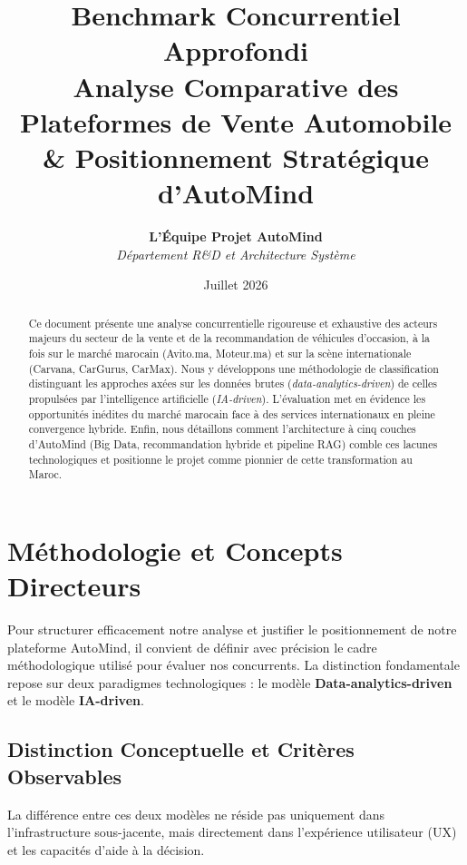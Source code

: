 \documentclass[11pt,a4paper]{article}
\title{
    \Huge\bfseries Benchmark Concurrentiel Approfondi\\[0.4cm]
    \Large Analyse Comparative des Plateformes de Vente Automobile \& Positionnement Stratégique d'AutoMind
}
\author{
    \textbf{L'Équipe Projet AutoMind}\\
    \textit{Département R\&D et Architecture Système}
}
\date{Juillet 2026}
\begin{document}
\maketitle

\begin{abstract}
Ce document présente une analyse concurrentielle rigoureuse et exhaustive des acteurs majeurs du secteur de la vente et de la recommandation de véhicules d'occasion, à la fois sur le marché marocain (Avito.ma, Moteur.ma) et sur la scène internationale (Carvana, CarGurus, CarMax). Nous y développons une méthodologie de classification distinguant les approches axées sur les données brutes (\textit{data-analytics-driven}) de celles propulsées par l'intelligence artificielle (\textit{IA-driven}). L'évaluation met en évidence les opportunités inédites du marché marocain face à des services internationaux en pleine convergence hybride. Enfin, nous détaillons comment l'architecture à cinq couches d'AutoMind (Big Data, recommandation hybride et pipeline RAG) comble ces lacunes technologiques et positionne le projet comme pionnier de cette transformation au Maroc.
\end{abstract}

\newpage
\tableofcontents
\newpage

\section{Méthodologie et Concepts Directeurs}

Pour structurer efficacement notre analyse et justifier le positionnement de notre plateforme AutoMind, il convient de définir avec précision le cadre méthodologique utilisé pour évaluer nos concurrents. La distinction fondamentale repose sur deux paradigmes technologiques : le modèle \textbf{Data-analytics-driven} et le modèle \textbf{IA-driven}.

\subsection{Distinction Conceptuelle et Critères Observables}
La différence entre ces deux modèles ne réside pas uniquement dans l'infrastructure sous-jacente, mais directement dans l'expérience utilisateur (UX) et les capacités d'aide à la décision. 
\end{document}

